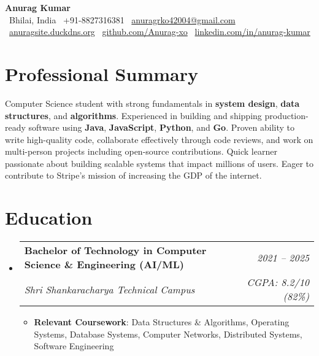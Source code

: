 \documentclass[letterpaper,10pt]{article}
\makeatletter
\newcommand{\resumeItem}[1]{
  \item\small{#1 \vspace{-2pt}}
}
\newcommand{\resumeSubheading}[4]{
  \vspace{-1pt}\item[]
    \begin{tabular*}{\textwidth}[t]{l@{\extracolsep{\fill}}r}
      \textbf{\color{accentcolor}#1} & {\small\textit{#2}} \\
      {\small\textit{#3}} & {\small\textit{#4}} \\
    \end{tabular*}\vspace{-7pt}
}
\newcommand{\resumeSubHeadingListStart}{\begin{itemize}[leftmargin=0in, label={}]}
\newcommand{\resumeSubHeadingListEnd}{\end{itemize}\vspace{-5pt}}
\newcommand{\resumeItemListStart}{\begin{itemize}[leftmargin=0.2in, rightmargin=0in]}
\newcommand{\resumeItemListEnd}{\end{itemize}\vspace{-2pt}}
\makeatother
\begin{document}
\begin{center}
    {\Huge\textbf{\color{accentcolor}Anurag Kumar}} \\ \vspace{8pt}
    \small
    \faMapMarker* \ Bhilai, India \quad
    \faPhone \ +91-8827316381 \quad
    \faEnvelope \ \href{mailto:anuragrko42004@gmail.com}{anuragrko42004@gmail.com}
    \\ \vspace{4pt}
    \faGlobe \ \href{http://anuragsite.duckdns.org}{anuragsite.duckdns.org} \quad
    \faGithub \ \href{https://github.com/Anurag-xo}{github.com/Anurag-xo} \quad
    \faLinkedin \ \href{https://www.linkedin.com/in/anurag-kumar-b1a790249}{linkedin.com/in/anurag-kumar}
\end{center}
\vspace{-15pt}

\section{Professional Summary}
\vspace{2pt}
Computer Science student with strong fundamentals in \textbf{system design}, \textbf{data structures}, and \textbf{algorithms}. Experienced in building and shipping production-ready software using \textbf{Java}, \textbf{JavaScript}, \textbf{Python}, and \textbf{Go}. Proven ability to write high-quality code, collaborate effectively through code reviews, and work on multi-person projects including open-source contributions. Quick learner passionate about building scalable systems that impact millions of users. Eager to contribute to Stripe's mission of increasing the GDP of the internet.

\section{Education}
\resumeSubHeadingListStart

\resumeSubheading
  {Bachelor of Technology in Computer Science \& Engineering (AI/ML)}{2021 -- 2025}
  {Shri Shankaracharya Technical Campus}{CGPA: 8.2/10 (82\%)}
  \resumeItemListStart
    \resumeItem{\textbf{Relevant Coursework}: Data Structures \& Algorithms, Operating Systems, Database Systems, Computer Networks, Distributed Systems, Software Engineering}
  \resumeItemListEnd

\resumeSubHeadingListEnd

\end{document}
